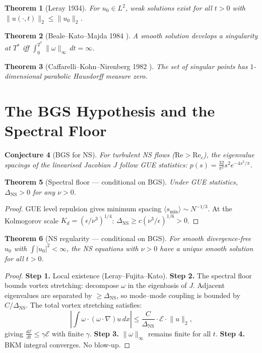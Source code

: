 \documentclass[11pt,a4paper]{article}
\theoremstyle{plain}
\newtheorem{theorem}{Theorem}[section]
\newtheorem{conjecture}[theorem]{Conjecture}
\theoremstyle{definition}
\theoremstyle{remark}
\newcommand{\abs}[1]{\lvert #1 \rvert}
\newcommand{\norm}[1]{\lVert #1 \rVert}
\begin{document}
\begin{theorem}[Leray 1934]
For $u_0 \in L^2$, weak solutions exist for all $t > 0$ with $\norm{u(\cdot,t)}_2 \leq \norm{u_0}_2$.
\end{theorem}

\begin{theorem}[Beale--Kato--Majda 1984 \cite{BKM1984}]
A smooth solution develops a singularity at $T^*$ iff $\int_0^{T^*} \norm{\omega}_\infty\,dt = \infty$.
\end{theorem}

\begin{theorem}[Caffarelli--Kohn--Nirenberg 1982 \cite{CKN1982}]
The set of singular points has $1$-dimensional parabolic Hausdorff measure zero.
\end{theorem}

\section{The BGS Hypothesis and the Spectral Floor}

\begin{conjecture}[BGS for NS]
For turbulent NS flows ($\text{Re} > \text{Re}_c$), the eigenvalue spacings of the linearised Jacobian $J$ follow GUE statistics: $p(s) = \frac{32}{\pi^2}s^2 e^{-4s^2/\pi}$.
\end{conjecture}

\begin{theorem}[Spectral floor --- conditional on BGS]\label{thm:floor}
Under GUE statistics, $\Delta_{\text{NS}} > 0$ for any $\nu > 0$.
\end{theorem}

\begin{proof}
GUE level repulsion gives minimum spacing $\langle s_{\min} \rangle \sim N^{-1/3}$. At the Kolmogorov scale $K_d = (\epsilon/\nu^3)^{1/4}$: $\Delta_{\text{NS}} \geq c(\nu^3/\epsilon)^{1/6} > 0$.
\end{proof}

\begin{theorem}[NS regularity --- conditional on BGS]\label{thm:NS}
For smooth divergence-free $u_0$ with $\int \abs{u_0}^2 < \infty$, the NS equations with $\nu > 0$ have a unique smooth solution for all $t > 0$.
\end{theorem}

\begin{proof}
\textbf{Step 1.} Local existence (Leray--Fujita--Kato). \textbf{Step 2.} The spectral floor bounds vortex stretching: decompose $\omega$ in the eigenbasis of $J$. Adjacent eigenvalues are separated by $\geq \Delta_{\text{NS}}$, so mode--mode coupling is bounded by $C/\Delta_{\text{NS}}$. The total vortex stretching satisfies:
\[
\left\lvert \int \omega \cdot (\omega \cdot \nabla)u\,dx \right\rvert \leq \frac{C}{\Delta_{\text{NS}}} \cdot \mathcal{E} \cdot \norm{u}_2,
\]
giving $\frac{d\mathcal{E}}{dt} \leq \gamma \mathcal{E}$ with finite $\gamma$. \textbf{Step 3.} $\norm{\omega}_\infty$ remains finite for all $t$. \textbf{Step 4.} BKM integral converges. No blow-up.
\end{proof}
\end{document}
